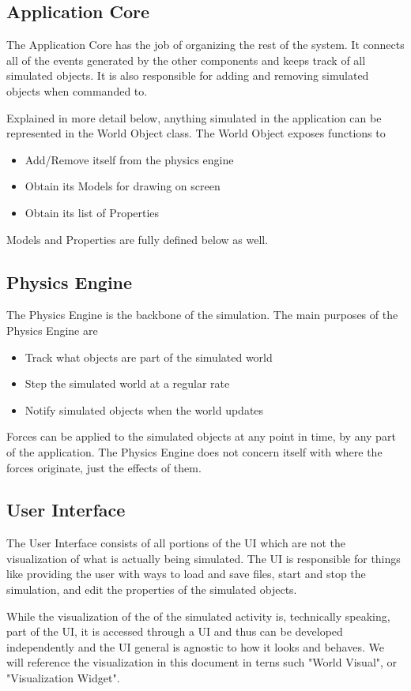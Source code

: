 \subsection{Application Core}
The Application Core has the job of organizing the rest of the system. It connects all of the events generated by the other components and keeps track of all simulated objects. It is also responsible for adding and removing simulated objects when commanded to.

Explained in more detail below, anything simulated in the application can be represented in the World Object class. The World Object exposes functions to
\begin{itemize}
	\item Add/Remove itself from the physics engine
	\item Obtain its Models for drawing on screen
	\item Obtain its list of Properties
\end{itemize}

Models and Properties are fully defined below as well.

\subsection{Physics Engine}
The Physics Engine is the backbone of the simulation. The main purposes of the Physics Engine are
	\begin{itemize}
		\item Track what objects are part of the simulated world
		\item Step the simulated world at a regular rate
		\item Notify simulated objects when the world updates
	\end{itemize}
Forces can be applied to the simulated objects at any point in time, by any part of the application. The Physics Engine does not concern itself with where the forces originate, just the effects of them.
 
\subsection{User Interface}
The User Interface consists of all portions of the UI which are not the visualization of what is actually being simulated. The UI is responsible for things like providing the user with ways to load and save files, start and stop the simulation, and edit the properties of the simulated objects.

While the visualization of the of the simulated activity is, technically speaking, part of the UI, it is accessed through a UI and thus can be developed independently and the UI general is agnostic to how it looks and behaves. We will reference the visualization in this document in terns such "World Visual", or "Visualization Widget".

